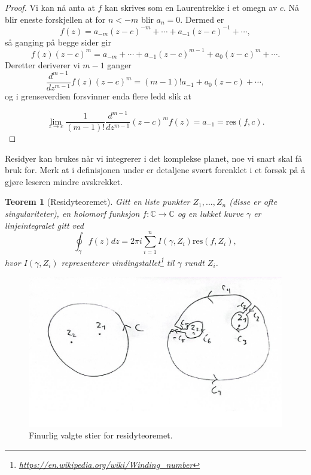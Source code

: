 \documentclass{article}
\newtheorem{theorem}{Teorem}
\begin{document}
\begin{proof}
    Vi kan nå anta at $f$ kan skrives som en Laurentrekke i et omegn av $c$. Nå blir eneste forskjellen at for $n < -m$ blir $a_n=0$. Dermed er 
    \[
        f(z) = a_{-m}(z - c)^{-m} + \cdots + a_{-1} (z-c)^{-1} + \cdots,
    \]
    så ganging på begge sider gir
    \[
        f(z)(z - c)^{m} = a_{-m} + \cdots + a_{-1} (z-c)^{m - 1} + a_0 (z - c)^m + \cdots.
    \]
    Deretter deriverer vi $m - 1$ ganger
    \[
        \frac{d^{m - 1}}{dz^{m - 1}} f(z)(z - c)^{m} = (m - 1)!a_{-1} + a_0 (z - c) + \cdots,
    \]
    og i grenseverdien forsvinner enda flere ledd slik at

    \[
        \lim_{z \to c} \frac{1}{(m - 1)!} \frac{d^{m - 1}}{dz^{m - 1}} (z - c)^m f(z) = a_{-1} = \mathrm{res}(f, c).
    \]
\end{proof}

Residyer kan brukes når vi integrerer i det komplekse planet, noe vi snart skal få bruk for. Merk at i definisjonen under er detaljene svært forenklet i et forsøk på å gjøre leseren mindre avskrekket.

\begin{theorem}[Residyteoremet]
    Gitt en liste punkter $Z_1, ... , Z_n$ (disse er ofte singulariteter), en holomorf funksjon $f:\mathbb{C} \longrightarrow \mathbb{C}$ og en lukket kurve $\gamma$ er linjeintegralet gitt ved \[
    \oint_\gamma f(z) dz = 2 \pi i \sum_{i = 1}^n I(\gamma, Z_i) \mathrm{res}(f, Z_i),
    \] hvor $I(\gamma, Z_i)$ representerer vindingstallet\footnote{\url{https://en.wikipedia.org/wiki/Winding_number}} til $\gamma$ rundt $Z_i$.
\end{theorem}

\begin{figure}
        \centering
        \includegraphics[width=\linewidth]{images/residuethm.png}
        \caption{Finurlig valgte stier for residyteoremet.}
        \label{fig:residuethm}
\end{figure} 
\end{document}
